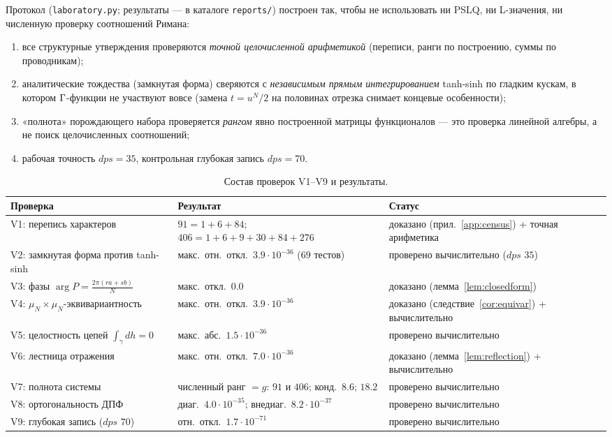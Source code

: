 Протокол (\texttt{laboratory.py}; результаты --- в каталоге
\texttt{reports/}) построен так, чтобы не использовать ни PSLQ, ни
L-значения, ни численную проверку соотношений Римана:
\begin{enumerate}[leftmargin=2em, itemsep=0.15em]
\item все структурные утверждения проверяются \emph{точной
  целочисленной арифметикой} (переписи, ранги по построению, суммы
  по проводникам);
\item аналитические тождества (замкнутая форма) сверяются с
  \emph{независимым прямым интегрированием} tanh-sinh по гладким
  кускам, в котором $\Gamma$-функции не участвуют вовсе (замена
  $t=u^N/2$ на половинах отрезка снимает концевые особенности);
\item «полнота» порождающего набора проверяется \emph{рангом} явно
  построенной матрицы функционалов --- это проверка линейной
  алгебры, а не поиск целочисленных соотношений;
\item рабочая точность $dps=35$, контрольная глубокая запись
  $dps=70$.
\end{enumerate}

\begin{table}[t]
\centering
\caption{Состав проверок V1--V9 и результаты.}
\label{tab:vprotocol}
\small
\begin{tabularx}{\textwidth}{@{}l >{\raggedright\arraybackslash}X >{\raggedright\arraybackslash}p{4.3cm}@{}}
\toprule
Проверка & Результат & Статус \\
\midrule
V1: перепись характеров & $91=1+6+84$;\newline
  $406=1+6+9+30+84+276$ & доказано (прил.~\ref{app:census}) +
  точная арифметика \\
V2: замкнутая форма против tanh-sinh & макс.\ отн.\ откл.\
  $3.9\cdot10^{-36}$ ($69$ тестов) & проверено вычислительно
  ($dps$ $35$) \\
V3: фазы $\arg P=\frac{2\pi(ra+sb)}{N}$ & макс.\ откл.\ $0.0$ &
  доказано (лемма~\ref{lem:closedform}) \\
V4: $\mu_N\times\mu_N$-эквивариантность & макс.\ отн.\ откл.\
  $3.9\cdot10^{-36}$ & доказано (следствие~\ref{cor:equivar}) +
  вычислительно \\
V5: целостность цепей $\int_\gamma dh=0$ & макс.\ абс.\
  $1.5\cdot10^{-36}$ & проверено вычислительно \\
V6: лестница отражения & макс.\ отн.\ откл.\ $7.0\cdot10^{-36}$ &
  доказано (лемма~\ref{lem:reflection}) + вычислительно \\
V7: полнота системы & численный ранг $=g$: $91$ и $406$; конд.\
  $8.6$; $18.2$ & проверено вычислительно \\
V8: ортогональность ДПФ & диаг.\ $4.0\cdot10^{-35}$; внедиаг.\
  $8.2\cdot10^{-37}$ & проверено вычислительно \\
V9: глубокая запись ($dps$ $70$) & отн.\ откл.\ $1.7\cdot10^{-71}$ &
  проверено вычислительно \\
\bottomrule
\end{tabularx}
\end{table}

